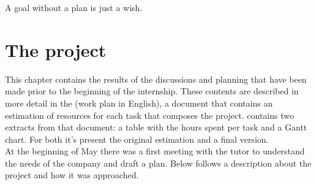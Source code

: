 \begin{savequote}[75mm]
	A goal without a plan is just a wish.
\end{savequote}

\chapter{The project}
\label{chapter_2}

This chapter contains the results of the discussions and planning that have been made prior to the beginning of the internship.
These contents are described in more detail in the  (work plan in English), a document that contains an estimation of resources for each task that composes the project.
 contains two extracts from that document: a table with the hours spent per task and a Gantt chart.
For both it's present the original estimation and a final version.\\
At the beginning of May there was a first meeting with the tutor to understand the needs of the company and draft a plan.
Below follows a description about the project and how it was approached.

